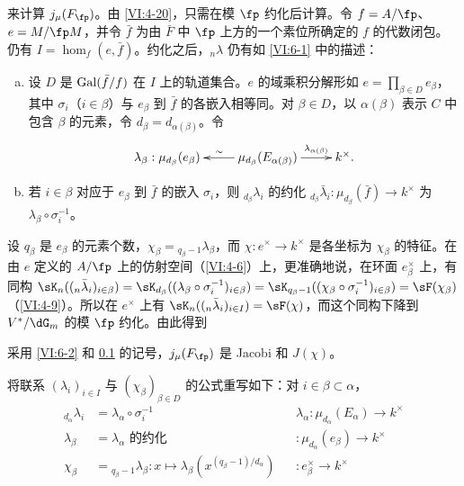 \subsection{}\label{VI:6-3}

来计算 $j_\mu(F_\fp)$。由 \ref{VI:4-20}，只需在模 $\fp$ 约化后计算。令 $f=A/\fp$、$e=M/\fp  M$，并令 $\bar f$ 为由 $\bar F$ 中 $\fp$ 上方的一个素位所确定的 $f$ 的代数闭包。仍有 $I=\hom_f(e,\bar f)$。约化之后，$_n\lambda$ 仍有如 \ref{VI:6-1} 中的描述：
\begin{enumerate}[a)]
  \item 设 $D$ 是 $\operatorname{Gal}(\bar f/f)$ 在 $I$ 上的轨道集合。$e$ 的域乘积分解形如 $e=\prod_{\beta\in D} e_\beta$，其中 $\sigma_i$（$i\in \beta$）与 $e_\beta$ 到 $\bar f$ 的各嵌入相等同。对 $\beta\in D$，以 $\alpha(\beta)$ 表示 $C$ 中包含 $\beta$ 的元素，令 $d_\beta=d_{\alpha(\beta)}$。令
    \[\xymatrix{
      \lambda_\beta : \mu_{d_\beta}(e_\beta)
        & \ar[l]_-\sim \mu_{d_\beta}(E_{\alpha(\beta)}) \ar[r]^-{\lambda_{\alpha(\beta)}}
        & k^\times \text{.}
    }\]
  \item 若 $i\in \beta$ 对应于 $e_\beta$ 到 $\bar f$ 的嵌入 $\sigma_i$，则 $_{d_\beta} \lambda_i$ 的约化 $_{d_\beta} \bar\lambda_i:\mu_{d_\beta}(\bar f) \to k^\times$ 为 $\lambda_\beta \circ \sigma_i^{-1}$。
\end{enumerate}

设 $q_\beta$ 是 $e_\beta$ 的元素个数，$\chi_\beta={}_{q_\beta-1}\lambda_\beta$，而 $\chi:e^\times \to k^\times$ 是各坐标为 $\chi_\beta$ 的特征。在由 $e$ 定义的 $A/\fp$ 上的仿射空间（\ref{VI:4-6}）上，更准确地说，在环面 $e_\beta^\times$ 上，有同构 $\sK_n((_n\bar\lambda_i)_{i\in\beta}) = \sK_{d_\beta}((\lambda_\beta \circ \sigma_i^{-1})_{i\in\beta}) =\sK_{q_\beta-1}((\chi_\beta\circ \sigma_i^{-1})_{i\in\beta}) = \sF(\chi_\beta)$（\ref{VI:4-9}）。所以在 $e^\times$ 上有 $\sK_n((_n\bar\lambda_i)_{i\in I}) = \sF(\chi)$，而这个同构下降到 $V^\ast/\dG_m$ 的模 $\fp$ 约化。由此得到

\begin{proposition_}\label{VI:6-4}
采用 \ref{VI:6-2} 和 \ref{VI:6-3} 的记号，$j_\mu(F_\fp)$ 是 Jacobi 和 $J(\chi)$。
\end{proposition_}

将联系 $(\lambda_i)_{i\in I}$ 与 $(\chi_\beta)_{\beta\in D}$ 的公式重写如下：对 $i\in \beta\subset \alpha$，
\begin{align*}
  _{d_\alpha} \lambda_i &= \lambda_\alpha\circ \sigma_i^{-1} && \lambda_\alpha:\mu_{d_\alpha}(E_\alpha) \to k^\times \\
  \lambda_\beta &= \text{$\lambda_\alpha$ 的约化} && :\mu_{d_\alpha}(e_\beta) \to k^\times \\
  \chi_\beta &= {}_{q_\beta-1}\lambda_\beta: x\mapsto \lambda_\beta(x^{(q_\beta-1)/d_\alpha}) && :e_\beta^\times \to k^\times
\end{align*}

